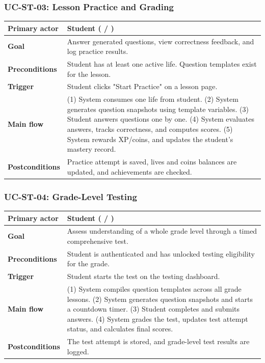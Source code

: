 \subsubsection{UC-ST-03: Lesson Practice and Grading}
\begin{longtable}{L{0.28\textwidth}L{0.62\textwidth}}
\textbf{Primary actor} & Student ( / ) \\ \hline
\textbf{Goal} & Answer generated questions, view correctness feedback, and log practice results. \\ \hline
\textbf{Preconditions} & Student has at least one active life. Question templates exist for the lesson. \\ \hline
\textbf{Trigger} & Student clicks "Start Practice" on a lesson page. \\ \hline
\textbf{Main flow} & (1) System consumes one life from student. (2) System generates question snapshots using template variables. (3) Student answers questions one by one. (4) System evaluates answers, tracks correctness, and computes scores. (5) System rewards XP/coins, and updates the student's mastery record. \\ \hline
\textbf{Postconditions} & Practice attempt is saved, lives and coins balances are updated, and achievements are checked. \\
\end{longtable}

\subsubsection{UC-ST-04: Grade-Level Testing}
\begin{longtable}{L{0.28\textwidth}L{0.62\textwidth}}
\textbf{Primary actor} & Student ( / ) \\ \hline
\textbf{Goal} & Assess understanding of a whole grade level through a timed comprehensive test. \\ \hline
\textbf{Preconditions} & Student is authenticated and has unlocked testing eligibility for the grade. \\ \hline
\textbf{Trigger} & Student starts the test on the testing dashboard. \\ \hline
\textbf{Main flow} & (1) System compiles question templates across all grade lessons. (2) System generates question snapshots and starts a countdown timer. (3) Student completes and submits answers. (4) System grades the test, updates test attempt status, and calculates final scores. \\ \hline
\textbf{Postconditions} & The test attempt is stored, and grade-level test results are logged. \\
\end{longtable}

